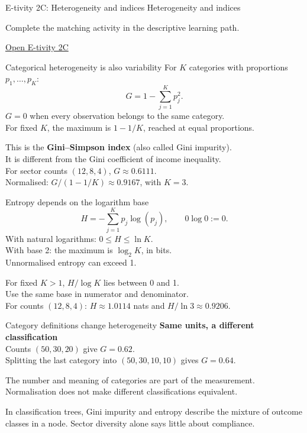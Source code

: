\begin{frame}{E-tivity 2C: Heterogeneity and indices}
\Large Heterogeneity and indices\par\vspace{5mm}
\normalsize Complete the matching activity in the descriptive learning path.\par
\href{https://silviasaliniunimi.github.io/data-analysis-tax-compliance/02c-heterogeneity.html}{Open E-tivity 2C}\par

\end{frame}

\begin{frame}{Categorical heterogeneity is also variability}
For $K$ categories with proportions $p_1,\ldots,p_K$:
\[G=1-\sum_{j=1}^K p_j^2.\]
$G=0$ when every observation belongs to the same category.\\
For fixed $K$, the maximum is $1-1/K$, reached at equal proportions.
\par\vspace{3mm}
This is the \textbf{Gini--Simpson index} (also called Gini impurity).\\
It is different from the Gini coefficient of income inequality.\\
For sector counts $(12,8,4)$, $G\approx0.6111$.\\
Normalised: $G/(1-1/K)\approx0.9167$, with $K=3$.
\end{frame}

\begin{frame}{Entropy depends on the logarithm base}
\[H=-\sum_{j=1}^K p_j\log(p_j),\qquad 0\log 0:=0.\]
With natural logarithms: $0\leq H\leq\ln K$.\\
With base 2: the maximum is $\log_2 K$, in bits.\\
Unnormalised entropy can exceed 1.
\par\vspace{3mm}
For fixed $K>1$, $H/\log K$ lies between 0 and 1.\\
Use the same base in numerator and denominator.\\
For counts $(12,8,4)$: $H\approx1.0114$ nats and $H/\ln3\approx0.9206$.
\end{frame}

\begin{frame}{Category definitions change heterogeneity}
\textbf{Same units, a different classification}\\
Counts $(50,30,20)$ give $G=0.62$.\\
Splitting the last category into $(50,30,10,10)$ gives $G=0.64$.
\par\vspace{4mm}
The number and meaning of categories are part of the measurement. Normalisation does not make different classifications equivalent.
\par\vspace{4mm}
In classification trees, Gini impurity and entropy describe the mixture of outcome classes in a node. Sector diversity alone says little about compliance.
\end{frame}

